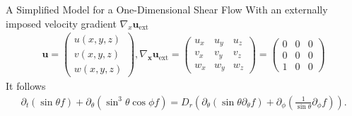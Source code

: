 \begin{frame}{A Simplified Model for a One-Dimensional Shear Flow}
	\scriptsize
	With an externally imposed velocity gradient $\nabla_x \boldsymbol{u}_{\mathrm{ext}}$
	\begin{align*}
		\boldsymbol{u}=\left(\begin{array}{l}
			u(x,y,z) \\
			v(x,y,z) \\
			w(x,y,z)
		\end{array}\right),
		\nabla_{\boldsymbol{x}} \boldsymbol{u}_{\mathrm{ext}}=\left(\begin{array}{lll}
			u_{x} & u_{y} & u_{z} \\
			v_{x} & v_{y} & v_{z} \\
			w_{x} & w_{y} & w_{z}
		\end{array}\right)=\left(\begin{array}{ccc}
			0 & 0 & 0 \\
			0 & 0 & 0 \\
			1 & 0 & 0
		\end{array}\right)
	\end{align*}
	It follows
    \begin{align}
	\partial_{t}\left(\sin \theta f\right)+ \partial_\theta\left( \sin ^3 \theta \cos \phi f\right)
	=D_{r}\left(\partial_\theta \left(\sin \theta \partial_\theta f\right)+ \partial_\phi\left(\frac{1}{\sin \theta} \partial_\phi f\right)\right). \label{smoEq}
    \end{align}
\end{frame}

